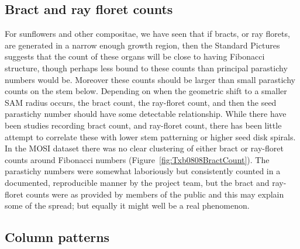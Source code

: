  \subsection{Bract and ray floret counts}
 For sunflowers and other compositae, we have seen that if bracts, or ray florets, are generated in a narrow enough growth region, then the Standard Pictures suggests that the count of these organs will be close to having Fibonacci structure,  though perhaps less bound to these counts than principal parastichy numbers would be. Moreover these counts should be larger than small parastichy counts on the stem below. Depending on when the geometric shift to a smaller SAM radius occurs, the bract count, the ray-floret count, and then the seed parastichy number should have some detectable relationship. While there have been studies recording bract count, and ray-floret count, there has been little attempt to correlate these with lower stem patterning or higher seed disk spirals.
 In the MOSI dataset there was no clear clustering of either bract or ray-floret counts around Fibonacci numbers (Figure~\ref{fig:Txb0808BractCount}). The parastichy numbers were somewhat laboriously but consistently counted in a documented, reproducible manner by the project team, but the bract and ray-floret counts were as provided by members of the public and this may explain some of the spread; but equally it might well be a real phenomenon. 
  
 
\subsection{Column patterns}
  
